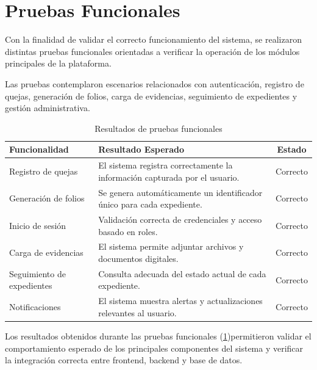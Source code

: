 \section{Pruebas Funcionales}

Con la finalidad de validar el correcto funcionamiento del sistema, se realizaron distintas pruebas funcionales orientadas a verificar la operación de los módulos principales de la plataforma.

Las pruebas contemplaron escenarios relacionados con autenticación, registro de quejas, generación de folios, carga de evidencias, seguimiento de expedientes y gestión administrativa.

\begin{table}[H]
\centering
\caption{Resultados de pruebas funcionales}
\label{tab:pruebas_funcionales}
\renewcommand{\arraystretch}{1.4}
\begin{tabularx}{\textwidth}{|p{6cm}|X|c|}
\hline
\textbf{Funcionalidad} & \textbf{Resultado Esperado} & \textbf{Estado} \\
\hline

Registro de quejas &
El sistema registra correctamente la información capturada por el usuario. &
Correcto \\
\hline

Generación de folios &
Se genera automáticamente un identificador único para cada expediente. &
Correcto \\
\hline

Inicio de sesión &
Validación correcta de credenciales y acceso basado en roles. &
Correcto \\
\hline

Carga de evidencias &
El sistema permite adjuntar archivos y documentos digitales. &
Correcto \\
\hline

Seguimiento de expedientes &
Consulta adecuada del estado actual de cada expediente. &
Correcto \\
\hline

Notificaciones &
El sistema muestra alertas y actualizaciones relevantes al usuario. &
Correcto \\
\hline

\end{tabularx}
\end{table}

Los resultados obtenidos durante las pruebas funcionales (\ref{tab:pruebas_funcionales})permitieron validar el comportamiento esperado de los principales componentes del sistema y verificar la integración correcta entre frontend, backend y base de datos.

